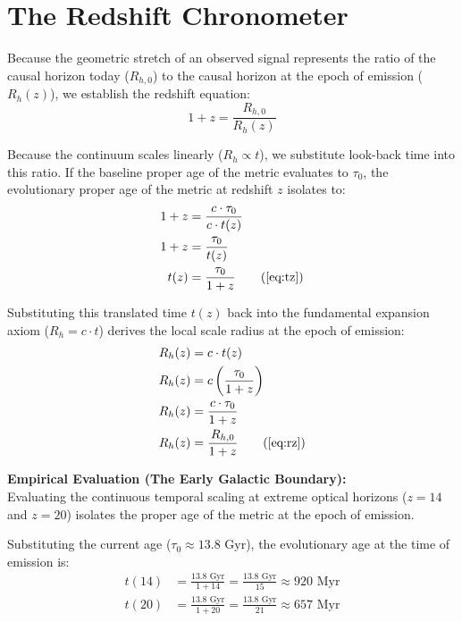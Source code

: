 \section{The Redshift Chronometer}
\label{sec:deriv_chronometer}

Because the geometric stretch of an observed signal represents the ratio of the causal horizon today ($R_{h,0}$) to the causal horizon at the epoch of emission ($R_h(z)$), we establish the redshift equation: 
\begin{equation}
    1+z = \frac{R_{h,0}}{R_h(z)}
\end{equation}

Because the continuum scales linearly ($R_h \propto t$), we substitute look-back time into this ratio. If the baseline proper age of the metric evaluates to $\tau_0$, the evolutionary proper age of the metric at redshift $z$ isolates to: 
\begin{align}
    1+z &= \frac{c \cdot \tau_0}{c \cdot t(z)} \\
    1+z &= \frac{\tau_0}{t(z)} \\
    t(z) &= \frac{\tau_0}{1+z} \tag{\ref{eq:tz}} 
\end{align}

Substituting this translated time $t(z)$ back into the fundamental expansion axiom ($R_h = c \cdot t$) derives the local scale radius at the epoch of emission:
\begin{align}
    R_h(z) &= c \cdot t(z) \\
    R_h(z) &= c \left( \frac{\tau_0}{1+z} \right) \\
    R_h(z) &= \frac{c \cdot \tau_0}{1+z} \\
    R_h(z) &= \frac{R_{h,0}}{1+z} \tag{\ref{eq:rz}} 
\end{align}

\vspace{0.2cm}
\textbf{Empirical Evaluation (The Early Galactic Boundary):} \\
Evaluating the continuous temporal scaling at extreme optical horizons ($z = 14$ and $z = 20$) isolates the proper age of the metric at the epoch of emission. 

Substituting the current age ($\tau_0 \approx 13.8 \text{ Gyr}$), the evolutionary age at the time of emission is:
\begin{align}
    t(14) &= \frac{13.8 \text{ Gyr}}{1 + 14} = \frac{13.8 \text{ Gyr}}{15} \approx 920 \text{ Myr} \\
    t(20) &= \frac{13.8 \text{ Gyr}}{1 + 20} = \frac{13.8 \text{ Gyr}}{21} \approx 657 \text{ Myr}
\end{align}

